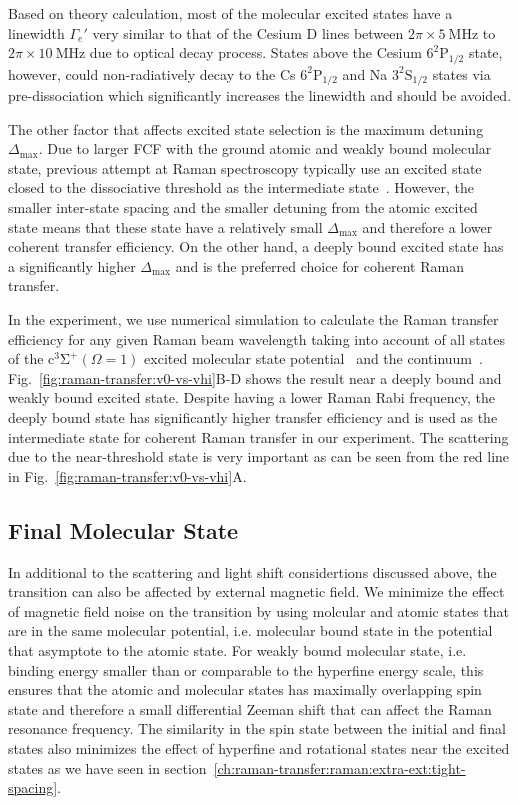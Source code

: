 Based on theory calculation, most of the molecular excited states have a linewidth $\Gamma_e'$
very similar to that of the Cesium D lines between $2\pi\times5~\mathrm{MHz}$ to
$2\pi\times10~\mathrm{MHz}$ due to optical decay process.
States above the Cesium $\mathrm{6^2P_{1/2}}$ state,
however, could non-radiatively decay to the Cs $\mathrm{6^2P_{1/2}}$
and Na $\mathrm{3^2S_{1/2}}$ states
via pre-dissociation which significantly increases the linewidth and should be avoided.

The other factor that affects excited state selection is the maximum detuning $\Delta_{\max}$.
Due to larger FCF with the ground atomic and weakly bound molecular state,
previous attempt at Raman spectroscopy typically use an excited state
closed to the dissociative threshold as
the intermediate state~\cite{wynar_molecules_2000,rom_state_2004}.
However, the smaller inter-state spacing and the smaller detuning from
the atomic excited state means that these state have a relatively small $\Delta_{\max}$
and therefore a lower coherent transfer efficiency.
On the other hand, a deeply bound excited state has a significantly higher $\Delta_{\max}$
and is the preferred choice for coherent Raman transfer.

In the experiment, we use numerical simulation to calculate the Raman transfer efficiency
for any given Raman beam wavelength taking into account of all states of
the $\mathrm{c^3\Sigma^+}(\Omega = 1)$
excited molecular state potential~\cite{grochola_spin-forbidden_2011}
and the continuum~\cite{liu_ultracold_2017}.
Fig.~\ref{fig:raman-transfer:v0-vs-vhi}B-D shows the result near a deeply bound
and weakly bound excited state.
Despite having a lower Raman Rabi frequency,
the deeply bound state has significantly higher transfer efficiency
and is used as the intermediate state for coherent Raman transfer in our experiment.
The scattering due to the near-threshold state is very important as can be seen
from the red line in Fig.~\ref{fig:raman-transfer:v0-vs-vhi}A.

\subsection{Final Molecular State}
\label{ch:raman-transfer:state-selction:final}

In additional to the scattering and light shift considertions discussed above,
the transition can also be affected by external magnetic field.
We minimize the effect of magnetic field noise on the transition by using molcular
and atomic states that are in the same molecular potential,
i.e. molecular bound state in the potential that asymptote to
the atomic state. For weakly bound molecular state,
i.e. binding energy smaller than or comparable to the hyperfine energy scale,
this ensures that the atomic and molecular states has maximally overlapping spin state
and therefore a small differential Zeeman shift that can affect the Raman resonance frequency.
The similarity in the spin state between the initial and final states
also minimizes the effect of hyperfine and rotational states near the excited states
as we have seen in section~\ref{ch:raman-transfer:raman:extra-ext:tight-spacing}.

